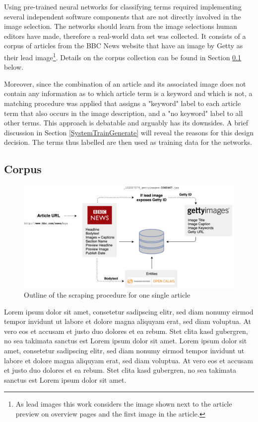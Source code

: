\documentclass[11pt,a4paper,twoside]{article}
\begin{document}
\bigskip

Using pre-trained neural networks for classifying terms required implementing several independent software components that are not directly involved in the image selection. The networks should learn from the image selections human editors have made, therefore a real-world data set was collected. It consists of a corpus of articles from the BBC News website \cite{BBCBBCNews} that have an image by Getty as their lead image\footnote{As lead images this work considers the image shown next to the article preview on overview pages and the first image in the article.}. Details on the corpus collection can be found in Section \ref{SystemCorpus} below.

Moreover, since the combination of an article and its associated image does not contain any information as to which article term is a keyword and which is not, a matching procedure was applied that assigns a "keyword" label to each article term that also occurs in the image description, and a "no keyword" label to all other terms. This approach is debatable and arguably has its downsides. A brief discussion in Section \ref{SystemTrainGenerate} will reveal the reasons for this design decision. The terms thus labelled are then used as training data for the networks.

\subsection{Corpus} \label{SystemCorpus}

\begin{figure}[t]
  \includegraphics[width=\columnwidth]{picpic-scraper.png}
  \caption{Outline of the scraping procedure for one single article}
  \label{fig:picpic-scraper}
\end{figure}

Lorem ipsum dolor sit amet, consetetur sadipscing elitr, sed diam nonumy eirmod tempor invidunt ut labore et dolore magna aliquyam erat, sed diam voluptua. At vero eos et accusam et justo duo dolores et ea rebum. Stet clita kasd gubergren, no sea takimata sanctus est Lorem ipsum dolor sit amet. Lorem ipsum dolor sit amet, consetetur sadipscing elitr, sed diam nonumy eirmod tempor invidunt ut labore et dolore magna aliquyam erat, sed diam voluptua. At vero eos et accusam et justo duo dolores et ea rebum. Stet clita kasd gubergren, no sea takimata sanctus est Lorem ipsum dolor sit amet.
\end{document}
